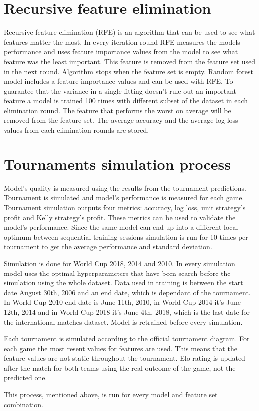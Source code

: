 \section{Recursive feature elimination}
Recursive feature elimination (RFE) is an algorithm that can be used to see what features matter the most. In every iteration round RFE measures the models performance and uses feature importance values from the model to see what feature was the least important. This feature is removed from the feature set used in the next round. Algorithm stops when the feature set is empty. \cite{granitto2006recursive} Random forest model includes a feature importance values and can be used with RFE. To guarantee that the variance in a single fitting doesn't rule out an important feature a model is trained 100 times with different subset of the dataset in each elimination round. The feature that performs the worst on average will be removed from the feature set. The average accuracy and the average log loss values from each elimination rounds are stored.

\section{Tournaments simulation process}
Model's quality is measured using the results from the tournament predictions. Tournament is simulated and model's performance is measured for each game. Tournament simulation outputs four metrics: accuracy, log loss, unit strategy's profit and Kelly strategy's profit. These metrics can be used to validate the model's performance. Since the same model can end up into a different local optimum between sequential training sessions simulation is run for 10 times per tournament to get the average performance and standard deviation.

Simulation is done for World Cup 2018, 2014 and 2010. In every simulation model uses the optimal hyperparameters that have been search before the simulation using the whole dataset. Data used in training is between the start date August 30th, 2006 and an end date, which is dependant of the tournament. In World Cup 2010 end date is June 11th, 2010, in World Cup 2014 it's June 12th, 2014 and in World Cup 2018 it's June 4th, 2018, which is the last date for the international matches dataset. Model is retrained before every simulation.

Each tournament is simulated according to the official tournament diagram. For each game the most resent values for features are used. This means that the feature values are not static throughout the tournament. Elo rating is updated after the match for both teams using the real outcome of the game, not the predicted one.

This process, mentioned above, is run for every model and feature set combination.